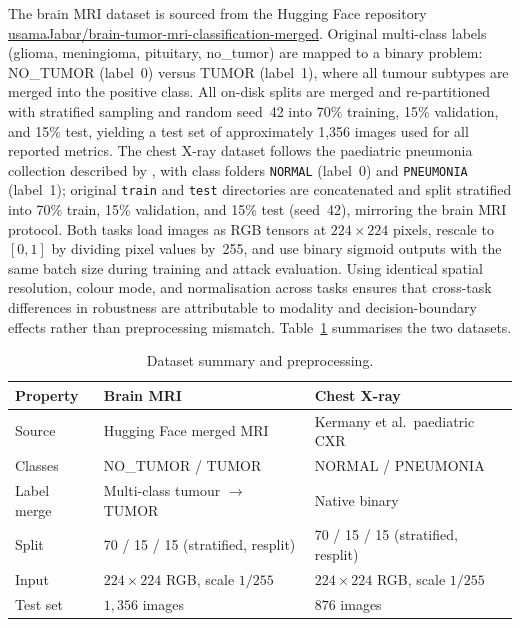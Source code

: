\documentclass[12pt,a4paper,oneside]{report}
\begin{document}
The brain MRI dataset is sourced from the Hugging Face repository \url{usamaJabar/brain-tumor-mri-classification-merged}. Original multi-class labels (glioma, meningioma, pituitary, no\_tumor) are mapped to a binary problem: NO\_TUMOR (label~0) versus TUMOR (label~1), where all tumour subtypes are merged into the positive class. All on-disk splits are merged and re-partitioned with stratified sampling and random seed~42 into 70\% training, 15\% validation, and 15\% test, yielding a test set of approximately 1{,}356 images used for all reported metrics. The chest X-ray dataset follows the paediatric pneumonia collection described by \citet{kermany2018identifying}, with class folders \texttt{NORMAL} (label~0) and \texttt{PNEUMONIA} (label~1); original \texttt{train} and \texttt{test} directories are concatenated and split stratified into 70\% train, 15\% validation, and 15\% test (seed~42), mirroring the brain MRI protocol. Both tasks load images as RGB tensors at $224 \times 224$ pixels, rescale to $[0,1]$ by dividing pixel values by~255, and use binary sigmoid outputs with the same batch size during training and attack evaluation. Using identical spatial resolution, colour mode, and normalisation across tasks ensures that cross-task differences in robustness are attributable to modality and decision-boundary effects rather than preprocessing mismatch. Table~\ref{tab:dataset-summary} summarises the two datasets.

\begin{table}[htbp]
  \centering
  \caption{Dataset summary and preprocessing.}
  \label{tab:dataset-summary}
  \small
  \begin{tabular}{p{2.2cm}p{4.8cm}p{4.8cm}}
    \toprule
    Property & Brain MRI & Chest X-ray \\
    \midrule
    Source & Hugging Face merged MRI & Kermany et al.\ paediatric CXR \\
    Classes & NO\_TUMOR / TUMOR & NORMAL / PNEUMONIA \\
    Label merge & Multi-class tumour $\rightarrow$ TUMOR & Native binary \\
    Split & 70 / 15 / 15 (stratified, resplit) & 70 / 15 / 15 (stratified, resplit) \\
    Input & $224 \times 224$ RGB, scale $1/255$ & $224 \times 224$ RGB, scale $1/255$ \\
    Test set & $1{,}356$ images & $876$ images \\
    \bottomrule
  \end{tabular}
\end{table}
\end{document}
